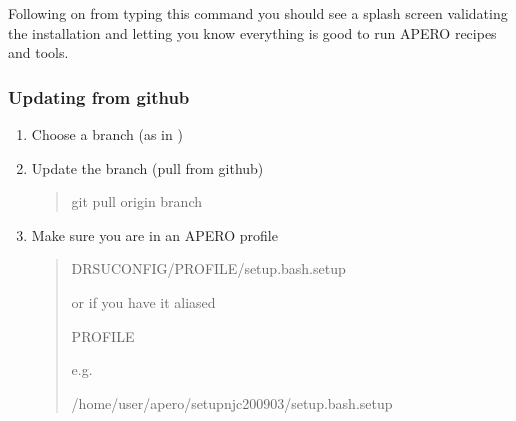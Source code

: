 \documentclass[a4paper,10pt,english]{report}
\begin{document}
Following on from typing this command you should see a splash screen validating the
installation and letting you know everything is good to run APERO recipes and tools.

\noindent{}


\subsubsection{Updating from github}
\label{\detokenize{user/general/installation:updating-from-github}}\label{\detokenize{user/general/installation:installation-update}}\begin{enumerate}
%
\item {} 
Choose a branch (as in {\hyperref[\detokenize{user/general/installation:installation-choose-branch}]{}})

\item {} 
Update the branch (pull from github)
\begin{quote}

\begin{sphinxVerbatim}[commandchars=\\\{\}]
git pull origin branch
\end{sphinxVerbatim}
\end{quote}

\item {} 
Make sure you are in an APERO profile
\begin{quote}

\begin{sphinxVerbatim}[commandchars=\\\{\}]
 DRS\PYGZus{}UCONFIG/PROFILE/setup.bash.setup
\end{sphinxVerbatim}

or if you have it aliased

\begin{sphinxVerbatim}[commandchars=\\\{\}]
PROFILE
\end{sphinxVerbatim}

e.g.

\begin{sphinxVerbatim}[commandchars=\\\{\}]
 /home/user/apero/setup\PYGZus{}njc\PYGZus{}200903/setup.bash.setup
\end{sphinxVerbatim}


\end{quote}
\end{enumerate}
\end{document}

